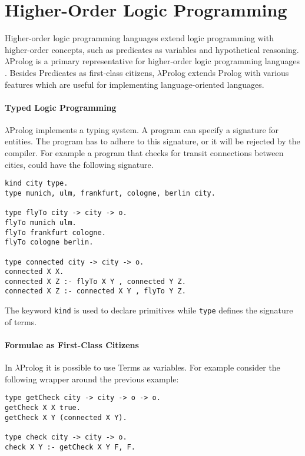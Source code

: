 

\section{Higher-Order Logic Programming}
\label{higher-order-logic-programming}
Higher-order logic programming languages extend logic programming with higher-order concepts, such as predicates as variables and hypothetical reasoning. $\lambda$Prolog is a primary representative for higher-order logic programming languages \cite{miller_programming_2012}. Besides Predicates as first-class citizens, $\lambda$Prolog extends Prolog with various features which are useful for implementing language-oriented languages.


\paragraph{Typed Logic Programming}
$\lambda$Prolog implements a typing system. A program can specify a signature for entities. The program has to adhere to this signature, or it will be rejected by the compiler. For example a program that checks for transit connections between cities, could have the following signature.

\begin{verbatim}
kind city type.
type munich, ulm, frankfurt, cologne, berlin city.

type flyTo city -> city -> o.
flyTo munich ulm.
flyTo frankfurt cologne.
flyTo cologne berlin.

type connected city -> city -> o.
connected X X.
connected X Z :- flyTo X Y , connected Y Z.
connected X Z :- connected X Y , flyTo Y Z.
\end{verbatim}

The keyword \lstinline{kind} is used to declare primitives while \lstinline{type} defines the signature of terms. 

\paragraph{Formulae as First-Class Citizens}
In $\lambda$Prolog it is possible to use Terms as variables. For example consider the following wrapper around the previous example:

\begin{verbatim}
type getCheck city -> city -> o -> o.
getCheck X X true.
getCheck X Y (connected X Y).

type check city -> city -> o.
check X Y :- getCheck X Y F, F.
\end{verbatim}

